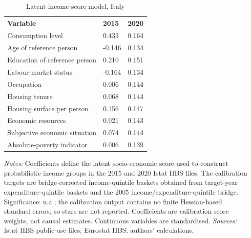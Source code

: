 \begin{table}[H]
\small
\setlength{\tabcolsep}{4pt}
\renewcommand{\arraystretch}{0.95}

\caption{\label{tab:it-hbs-latent-income-coefficients}Latent income-score model, Italy}
\centering
\begin{tabular}[t]{lll}
\toprule
Variable & 2015 & 2020\\
\midrule
Consumption level & 0.433 & 0.164\\
Age of reference person & -0.146 & 0.134\\
Education of reference person & 0.210 & 0.151\\
Labour-market status & -0.164 & 0.134\\
Occupation & 0.006 & 0.144\\
\addlinespace
Housing tenure & 0.068 & 0.144\\
Housing surface per person & 0.156 & 0.147\\
Economic resources & 0.021 & 0.143\\
Subjective economic situation & 0.074 & 0.144\\
Absolute-poverty indicator & 0.006 & 0.139\\
\bottomrule
\end{tabular}
\vspace{-0.6em}
\begin{flushleft}
\footnotesize{\emph{Notes:} Coefficients define the latent socio-economic score used to construct probabilistic income groups in the 2015 and 2020 Istat HBS files. The calibration targets are bridge-corrected income-quintile baskets obtained from target-year expenditure-quintile baskets and the 2005 income/expenditure-quintile bridge. Significance: n.a.; the calibration output contains no finite Hessian-based standard errors, so stars are not reported. Coefficients are calibration score weights, not causal estimates. Continuous variables are standardised. \emph{Sources:} Istat HBS public-use files; Eurostat HBS; authors' calculations.}
\end{flushleft}
\end{table}
